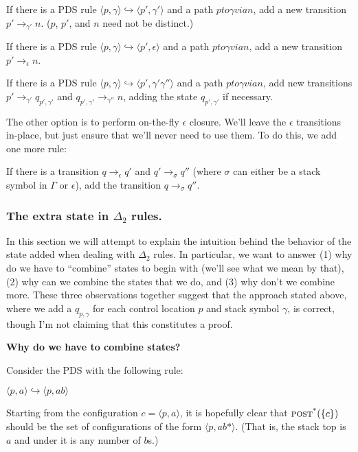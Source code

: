 \documentclass{article}
\newcommand{\Config}[2]{\ensuremath{\langle #1, #2 \rangle}}
\newcommand{\Rule}[2]{\ensuremath{#1 \hookrightarrow #2}}
\newcommand{\Trans}[3]{\ensuremath{#1 \rightarrow_{#2} #3}}
\newcommand{\epspath}[3]{\ensuremath{#1 to #2 via #3}}
\newcommand{\subsubsubsection}[1]{\textbf{#1}}
\newcommand{\poststar}{\ensuremath{\textsc{post}^\textsc{*}}}
\begin{document}
   If there is a PDS rule
   \Rule{\Config{p}{\gamma}}{\Config{p'}{\gamma'}} and a path
   \epspath{p}{\gamma}{n}, add a new transition
   \Trans{p'}{\gamma'}{n}. ($p$, $p'$, and $n$ need not be distinct.)

   If there is a PDS rule
   \Rule{\Config{p}{\gamma}}{\Config{p'}{\epsilon}} and a path
   \epspath{p}{\gamma}{n}, add a new transition
   \Trans{p'}{\epsilon}{n}.

   If there is a PDS rule
   \Rule{\Config{p}{\gamma}}{\Config{p'}{\gamma'\gamma''}} and a path
   \epspath{p}{\gamma}{n}, add new transitions
   \Trans{p'}{\gamma'}{q_{p',\gamma'}} and
   \Trans{q_{p',\gamma'}}{\gamma''}{n}, adding the state
   $q_{p',\gamma'}$ if necessary.


The other option is to perform on-the-fly $\epsilon$ closure. We'll
leave the $\epsilon$ transitions in-place, but just ensure that we'll
never need to use them. To do this, we add one more rule:

    If there is a transition \Trans{q}{\epsilon}{q'} and
    \Trans{q'}{\sigma}{q''} (where $\sigma$ can either be a stack
    symbol in $\Gamma$ or $\epsilon$), add the transition
    \Trans{q}{\sigma}{q''}.


\subsubsection{The extra state in $\Delta_2$ rules.}

In this section we will attempt to explain the intuition behind the
behavior of the state added when dealing with $\Delta_2$ rules.  In
particular, we want to answer (1) why do we have to ``combine'' states
to begin with (we'll see what we mean by that), (2) why can we combine
the states that we do, and (3) why don't we combine more. These three
observations together suggest that the approach stated above, where we
add a $q_{p,\gamma}$ for each control location $p$ and stack symbol
$\gamma$, is correct, though I'm not claiming that this constitutes a
proof.

\subsubsubsection{Why do we have to combine states?}

Consider the PDS with the following rule:

  \Rule{\Config{p}{a}}{\Config{p}{ab}}

Starting from the configuration $c = \Config{p}{a}$, it is hopefully
clear that $\poststar(\{c\})$ should be the set of configurations of
the form \Config{p}{ab*}. (That is, the stack top is $a$ and under it
is any number of $b$s.)
\end{document}
